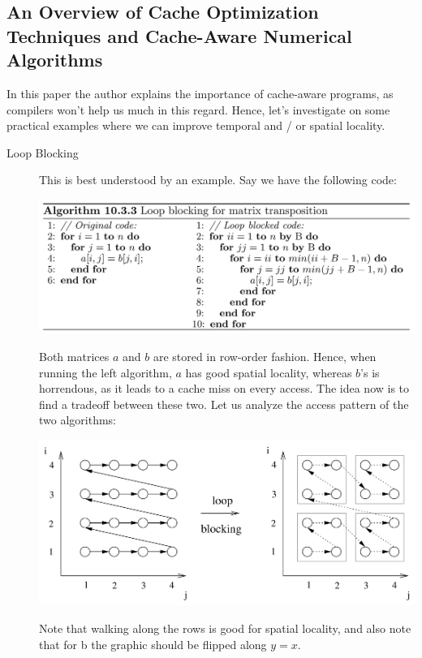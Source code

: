 \documentclass[../../main.tex]{subfiles}
\begin{document}
\bigskip
\subsection{An Overview of Cache Optimization Techniques and Cache-Aware Numerical Algorithms}
In this paper the author explains the importance of cache-aware programs, as compilers won't help us much in this regard. Hence, let's investigate on some practical examples where we can improve temporal and / or spatial locality.

\begin{description}
    \item[Loop Blocking] This is best understood by an example. Say we have the following code:
    
    \includegraphics[width=\linewidth]{Chapters/09/loop_blocking.png}

    Both matrices $a$ and $b$ are stored in row-order fashion. Hence, when running the left algorithm, $a$ has good spatial locality, whereas $b$'s is horrendous, as it leads to a cache miss on every access. The idea now is to find a tradeoff between these two. Let us analyze the access pattern of the two algorithms:

    \includegraphics[width=\linewidth]{Chapters/09/access_pattern.png}

    Note that walking along the rows is good for spatial locality, and also note that for b the graphic should be flipped along $y=x$.


\end{description}
\end{document}
